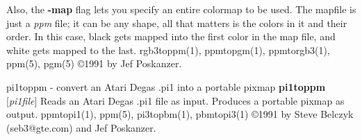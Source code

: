 \par
Also, the
{\bf -map}
flag lets you specify an entire colormap to be used.
The mapfile is just a
{\it ppm}
file; it can be any shape, all that matters
is the colors in it and their order.
In this case, black gets mapped into the first
color in the map file, and white gets mapped to the last.
rgb3toppm(1), ppmtopgm(1), ppmtorgb3(1), ppm(5), pgm(5)
\copyright 1991 by Jef Poskanzer.
%
 
%

\newpage
%

pi1toppm - convert an Atari Degas .pi1 into a portable pixmap
{\bf pi1toppm}
{\rm [}{\it pi1file}{\rm ]}
Reads an Atari Degas .pi1 file as input.
Produces a portable pixmap as output.
ppmtopi1(1), ppm(5), pi3topbm(1), pbmtopi3(1)
\copyright 1991 by Steve Belczyk (seb3@gte.com) and Jef Poskanzer.
%
 
%

